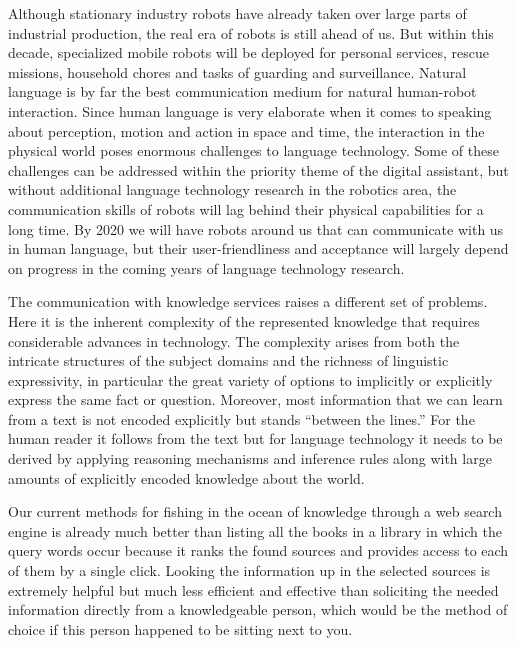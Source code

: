 \documentclass[10pt, plain]{../../metanetpaper}
\begin{document}
\begin{multicols}{2}
Although stationary industry robots have already taken over large parts of industrial production, the real era of robots is still ahead of us. But within this decade, specialized mobile robots will be deployed for personal services, rescue missions, household chores and tasks of guarding and surveillance. Natural language is by far the best communication medium for natural human-robot interaction. Since human language is very elaborate when it comes to speaking about perception, motion and action in space and time, the interaction in the physical world poses enormous challenges to language technology. Some of these challenges can be addressed within the priority theme of the digital assistant, but without additional language technology research in the robotics area, the communication skills of robots will lag behind their physical capabilities for a long time. By 2020 we will have robots around us that can communicate with us in human language, but their user-friendliness and acceptance will largely depend on progress in the coming years of language technology research.
 
The communication with knowledge services raises a different set of problems. Here it is the inherent complexity of the represented knowledge that requires considerable advances in technology. The complexity arises from both the intricate structures of the subject domains and the richness of linguistic expressivity, in particular the great variety of options to implicitly or explicitly express the same fact or question. Moreover, most information that we can learn from a text is not encoded explicitly but stands “between the lines.” For the human reader it follows from the text but for language technology it needs to be derived by applying reasoning mechanisms and inference rules along with large amounts of explicitly encoded knowledge about the world. 
 
Our current methods for fishing in the ocean of knowledge through a web search engine is already much better than listing all the books in a library in which the query words occur because it ranks the found sources and provides access to each of them by a single click. Looking the information up in the selected sources is extremely helpful but much less efficient and effective than soliciting the needed information directly from a knowledgeable person, which would be the method of choice if this person happened to be sitting next to you.
 

\end{multicols}
\end{document}
